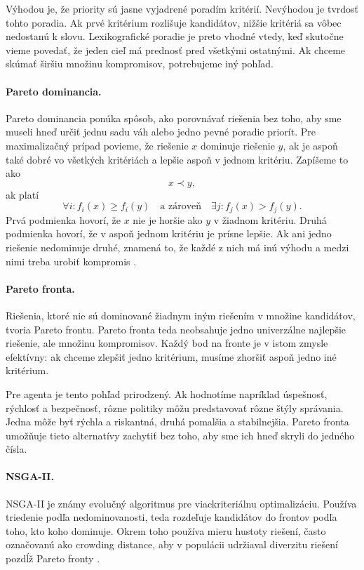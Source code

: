 Výhodou je, že priority sú jasne vyjadrené poradím kritérií. Nevýhodou je tvrdosť tohto poradia. Ak prvé kritérium rozlišuje kandidátov, nižšie kritériá sa vôbec nedostanú k slovu. Lexikografické poradie je preto vhodné vtedy, keď skutočne vieme povedať, že jeden cieľ má prednosť pred všetkými ostatnými. Ak chceme skúmať širšiu množinu kompromisov, potrebujeme iný pohľad.

\paragraph{Pareto dominancia.}
Pareto dominancia ponúka spôsob, ako porovnávať riešenia bez toho, aby sme museli hneď určiť jednu sadu váh alebo jedno pevné poradie priorít. Pre maximalizačný prípad povieme, že riešenie $x$ dominuje riešenie $y$, ak je aspoň také dobré vo všetkých kritériách a lepšie aspoň v jednom kritériu. Zapíšeme to ako
\[
    x \prec y,
\]
ak platí
\[
    \forall i: f_i(x) \ge f_i(y)
    \quad \text{a zároveň} \quad
    \exists j: f_j(x) > f_j(y).
\]
Prvá podmienka hovorí, že $x$ nie je horšie ako $y$ v žiadnom kritériu. Druhá podmienka hovorí, že v aspoň jednom kritériu je prísne lepšie. Ak ani jedno riešenie nedominuje druhé, znamená to, že každé z nich má inú výhodu a medzi nimi treba urobiť kompromis \cite{coello1999survey}.

\paragraph{Pareto fronta.}
Riešenia, ktoré nie sú dominované žiadnym iným riešením v množine kandidátov, tvoria Pareto frontu. Pareto fronta teda neobsahuje jedno univerzálne najlepšie riešenie, ale množinu kompromisov. Každý bod na fronte je v istom zmysle efektívny: ak chceme zlepšiť jedno kritérium, musíme zhoršiť aspoň jedno iné kritérium.

Pre agenta je tento pohľad prirodzený. Ak hodnotíme napríklad úspešnosť, rýchlosť a bezpečnosť, rôzne politiky môžu predstavovať rôzne štýly správania. Jedna môže byť rýchla a riskantná, druhá pomalšia a stabilnejšia. Pareto fronta umožňuje tieto alternatívy zachytiť bez toho, aby sme ich hneď skryli do jedného čísla.

\paragraph{NSGA-II.}
NSGA-II je známy evolučný algoritmus pre viackriteriálnu optimalizáciu. Používa triedenie podľa nedominovanosti, teda rozdeľuje kandidátov do frontov podľa toho, kto koho dominuje. Okrem toho používa mieru hustoty riešení, často označovanú ako crowding distance, aby v populácii udržiaval diverzitu riešení pozdĺž Pareto fronty \cite{deb2002nsga2}.


